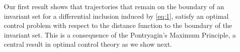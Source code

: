 \documentclass[reqno]{amsart}
\newtheorem{thm}{Theorem}[section]
\theoremstyle{definition}
\numberwithin{equation}{section}
\newcommand{\N}{\mathbb{N}}
\newcommand{\R}{\mathbb{R}}
\newcommand{\M}{\mathscr{M}}
\begin{document}

Our first result shows that trajectories that remain on the boundary of an invariant set for a differential inclusion induced by \eqref{eq:1}, satisfy an optimal control problem with respect to the distance function to the boundary of the invariant set. This is a consequence of the Pontryagin's Maximum Principle, a central result in optimal control theory as we show next.
\end{document}
